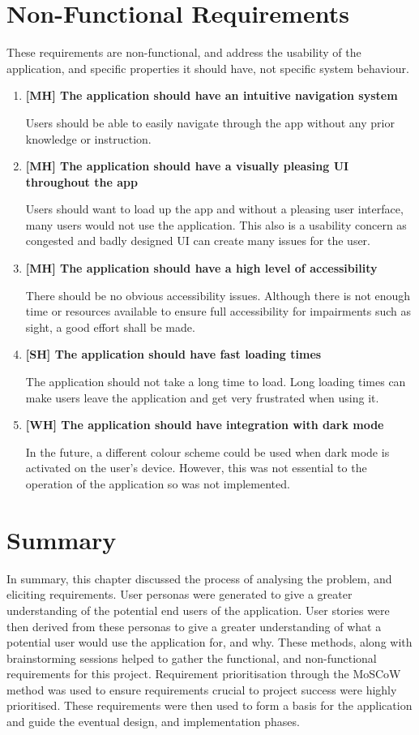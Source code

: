 \section{Non-Functional Requirements} \label{non-functional}
These requirements are non-functional, and address the usability of the application, and specific properties it should have, not specific system behaviour. 
\begin{enumerate}
    \item \textbf{[MH] The application should have an intuitive navigation system }\par
    Users should be able to easily navigate through the app without any prior knowledge or instruction.
    \item \textbf{[MH] The application should have a visually pleasing UI throughout the app }\par
    Users should want to load up the app and without a pleasing user interface, many users would not use the application. This also is a usability concern as congested and badly designed UI can create many issues for the user.
    \item \textbf{[MH] The application should have a high level of accessibility }\par
    There should be no obvious accessibility issues. Although there is not enough time or resources available to ensure full accessibility for impairments such as sight, a good effort shall be made.
    \item \textbf{[SH] The application should have fast loading times }\par
    The application should not take a long time to load. Long loading times can make users leave the application and get very frustrated when using it.
    \item \textbf{[WH] The application should have integration with dark mode }\par
    In the future, a different colour scheme could be used when dark mode is activated on the user's device. However, this was not essential to the operation of the application so was not implemented. 
\end{enumerate}

\section{Summary}

In summary, this chapter discussed the process of analysing the problem, and eliciting requirements. User personas were generated to give a greater understanding of the potential end users of the application. User stories were then derived from these personas to give a greater understanding of what a potential user would use the application for, and why. These methods, along with brainstorming sessions helped to gather the functional, and non-functional requirements for this project. Requirement prioritisation through the MoSCoW method was used to ensure requirements crucial to project success were highly prioritised. These requirements were then used to form a basis for the application and guide the eventual design, and implementation phases.